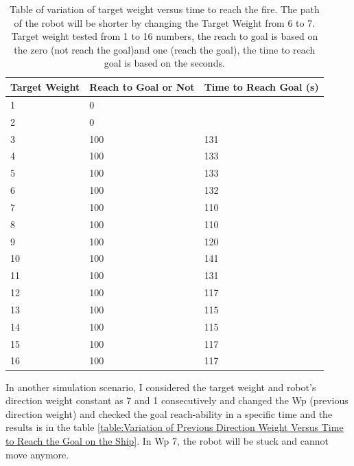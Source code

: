 \begin{table}[ht!]
\centering
    \begin{tabular}{ m{3cm} m{5cm} m{5cm} } 
    \toprule
    \toprule
    \textbf{Target Weight} & \textbf{Reach to Goal or Not} & \textbf{Time to Reach Goal (s)} \\
    \midrule
    1      & 0       &    \\[1.3ex]
    2       & 0    &    \\[1.3ex]
    3      & 100     & 131   \\[1.3ex]
    4      & 100     & 133   \\[1.3ex]
    5      & 100    & 133   \\[1.3ex]
    6     & 100     & 132     \\[1.3ex]
    7     & 100     & 110     \\[1.3ex]
    8     & 100     & 110   \\[1.3ex]
    9     & 100       & 120   \\[1.3ex]
    10     & 100       & 141   \\[1.3ex]
    11     & 100       & 131   \\[1.3ex]
    12     & 100       & 117   \\[1.3ex]
    13     & 100       & 115   \\[1.3ex]
    14     & 100       & 115   \\[1.3ex]
    15     & 100       &117    \\[1.3ex]
   16     & 100       &117    \\[1.3ex]
    \bottomrule
    \bottomrule
\end{tabular}
\caption[Variation of Target Weight Versus Time to Reach the fire on a Ship's Deck]{Table of variation of target weight versus time to reach the fire. The path of the robot will be shorter by changing the Target Weight from 6 to 7. Target weight tested from 1 to 16 numbers, the reach to goal is based on the zero (not reach the goal)and one (reach the goal), the time to reach goal is based on the seconds. }
\label{table:Variation of Target Weight Versus Time to Reach the Goal on the Ship}
\end{table} 

\noindent In another simulation scenario, I considered the target weight and robot's direction weight constant as 7 and 1 consecutively and changed the Wp (previous direction weight) and checked the goal reach-ability in a specific time and the results is in the table \ref{table:Variation of Previous Direction Weight Versus Time to Reach the Goal on the Ship}. In Wp 7, the robot will be stuck and cannot move anymore. 

